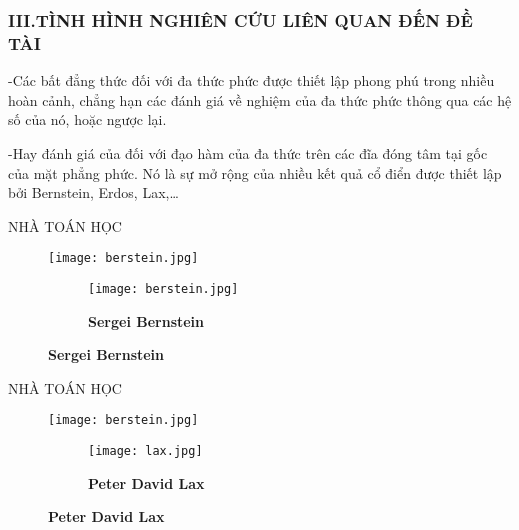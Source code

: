 \documentclass{beamer}
\begin{document}
\begin{frame}
\frametitle{III.TÌNH HÌNH NGHIÊN CỨU LIÊN QUAN ĐẾN ĐỀ TÀI}
\begin{block}{}
-Các bất đẳng thức đối với đa thức phức được thiết lập phong phú trong nhiều hoàn cảnh, chẳng hạn các đánh giá về nghiệm của đa thức phức thông qua các hệ số của nó, hoặc ngược lại.\vspace{0.3cm}\par -Hay đánh giá của đối với đạo hàm của đa thức trên các đĩa đóng tâm tại gốc của mặt phẳng phức. Nó là sự mở rộng của nhiều kết quả cổ điển được thiết lập bởi Bernstein, Erdos, Lax,…  
\end{block}
\end{frame}
\begin{frame}{ NHÀ TOÁN HỌC}
\begin{center}
    \begin{figure}[htp]
    \begin{center}
     \texttt{[image: berstein.jpg]}
\begin{figure}
        \centering
        \texttt{[image: berstein.jpg]}
        \caption{\bf{Sergei Bernstein}}
        \label{fig:enter-label}
    \end{figure}
    \end{center}
    \end{figure}
\end{center}
\end{frame}
\begin{frame}{ NHÀ TOÁN HỌC}
\begin{center}
    \begin{figure}[htp]
    \begin{center}
     \texttt{[image: berstein.jpg]}
\begin{figure}
        \centering
        \texttt{[image: lax.jpg]}
        \caption{\bf{Peter David Lax}}
        \label{fig:enter-label}
    \end{figure}
    \end{center}
    \end{figure}
\end{center}
\end{frame}
\end{document}
